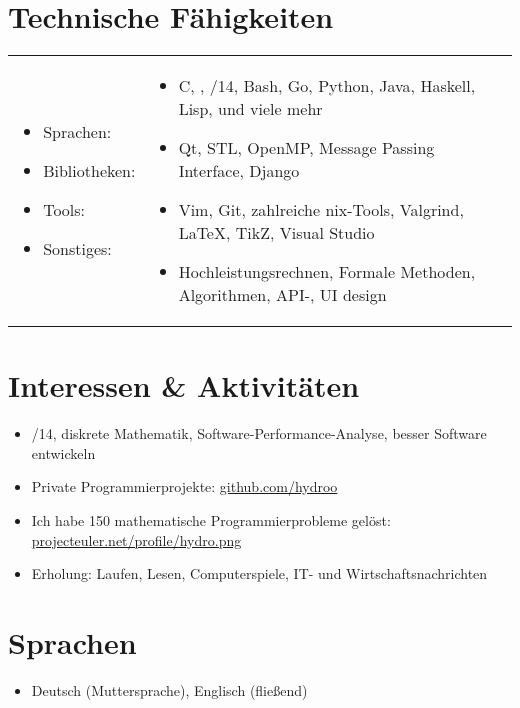 \section*{Technische F\"ahigkeiten}
\vspace{0.1cm} %
\begin{tabular}{l l}
	\begin{minipage}{0.18\textwidth}
		\begin{itemize}
			\item Sprachen:
			\item Bibliotheken:
			\item Tools:
			\item Sonstiges:
		\end{itemize}
	\end{minipage}
	&
	\begin{minipage}{0.80\textwidth}
		\begin{itemize}
			\item C, \cpp, \cpp11/14, Bash, Go, Python, Java, Haskell, Lisp, und viele mehr
			\item Qt, STL, OpenMP, Message Passing Interface, Django
			\item Vim, Git, zahlreiche \textasteriskcentered{}nix-Tools, Valgrind, \LaTeX, TikZ, Visual Studio
			\item Hochleistungsrechnen, Formale Methoden, Algorithmen, API-, UI design
		\end{itemize}
	\end{minipage}
\end{tabular}

\vspace{0.66cm} %

\customhrule
\section*{Interessen \& Aktivit\"aten}
\begin{itemize}
	\item {}/14, diskrete Mathematik, Software-Performance-Analyse, besser Software entwickeln
	\item Private Programmierprojekte: \href{https://github.com/hydroo}{github.com/hydroo}
	\item Ich habe 150 mathematische Programmierprobleme gel\"ost: \href{http://projecteuler.net/profile/hydro.png}{projecteuler.net/profile/hydro.png}
	\item Erholung: Laufen, Lesen, Computerspiele, IT- und Wirtschaftsnachrichten
\end{itemize}

\customhrule
\section*{Sprachen}
\begin{itemize}
	\item Deutsch (Muttersprache), Englisch (flie\ss end)
\end{itemize}


